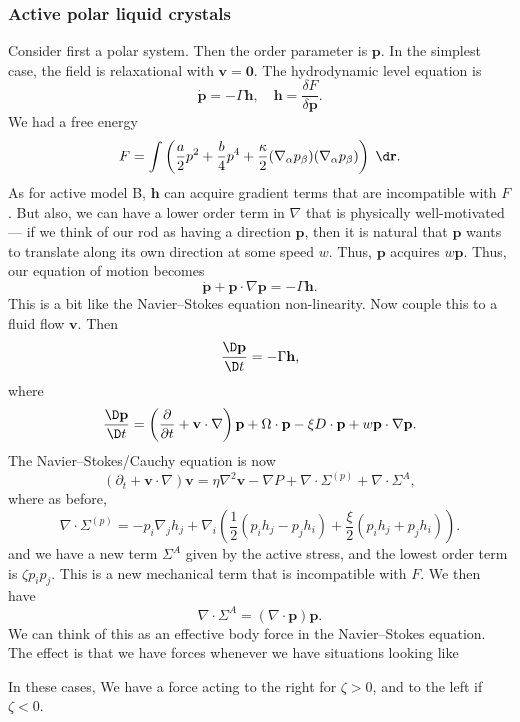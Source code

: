 \documentclass[a4paper]{article}
\begin{document}
\subsubsection*{Active polar liquid crystals}
Consider first a polar system. Then the order parameter is $\mathbf{p}$. In the simplest case, the field is relaxational with $\mathbf{v} = \mathbf{0}$. The hydrodynamic level equation is
\[
  \dot{\mathbf{p}} = - \Gamma \mathbf{h},\quad \mathbf{h} = \frac{\delta F}{\delta \mathbf{p}}.
\]
We had a free energy
\[
  F = \int \left(\frac{a}{2} p^2 + \frac{b}{4} p^4 + \frac{\kappa}{2} (\nabla_\alpha p_\beta)(\nabla_\alpha p_\beta)\right)\;\d \mathbf{r}.
\]
As for active model B, $\mathbf{h}$ can acquire gradient terms that are incompatible with $F$. But also, we can have a lower order term in $\nabla$ that is physically well-motivated --- if we think of our rod as having a direction $\mathbf{p}$, then it is natural that $\mathbf{p}$ wants to translate along its own direction at some speed $w$. Thus, $\mathbf{p}$ acquires  $w\mathbf{p}$. Thus, our equation of motion becomes
\[
  \dot{\mathbf{p}} + \mathbf{p} \cdot \nabla \mathbf{p} = - \Gamma \mathbf{h}.
\]
This is a bit like the Navier--Stokes equation non-linearity. Now couple this to a fluid flow $\mathbf{v}$. Then
\[
  \frac{\D\mathbf{p}}{\D t} = - \Gamma \mathbf{h},
\]
where
\[
  \frac{\D \mathbf{p}}{\D t} = \left(\frac{\partial}{\partial t} + \mathbf{v} \cdot \nabla\right)\mathbf{p} + \Omega \cdot \mathbf{p} - \xi D \cdot \mathbf{p} + w \mathbf{p} \cdot \nabla \mathbf{p}.
\]
The Navier--Stokes/Cauchy equation is now
\[
  (\partial_t + \mathbf{v} \cdot \nabla) \mathbf{v} = \eta \nabla^2 \mathbf{v} - \nabla P + \nabla \cdot \Sigma^{(p)} + \nabla \cdot \Sigma^A,
\]
where as before,
\[
  \nabla \cdot \Sigma^{(p)} = - p_i \nabla_j h_j + \nabla_i \left(\frac{1}{2} (p_i h_j - p_j h_i) + \frac{\xi}{2}(p_i h_j + p_j h_i)\right).
\]
and we have a new term $\Sigma^A$ given by the active stress, and the lowest order term is $\zeta p_i p_j$. This is a new mechanical term that is incompatible with $F$. We then have
\[
  \nabla \cdot \Sigma^A = (\nabla \cdot \mathbf{p}) \mathbf{p}.
\]
We can think of this as an effective body force in the Navier--Stokes equation. The effect is that we have forces whenever we have situations looking like
\begin{center}
\end{center}
In these cases, We have a force acting to the right for $\zeta > 0$, and to the left if $\zeta < 0$.
\end{document}
